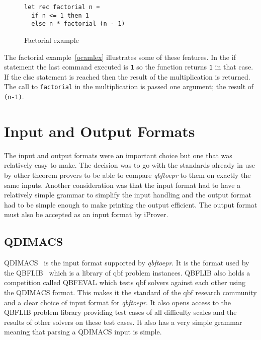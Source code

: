 \begin{figure}[H]
\caption{Factorial example}
\begin{CenteredBox}
\begin{lstlisting}[language=caml, label=ocamlex]
let rec factorial n =
  if n <= 1 then 1
  else n * factorial (n - 1)
\end{lstlisting}
\end{CenteredBox}
\end{figure}

The factorial example~\ref{ocamlex} illustrates some of these features. In the if statement the last command executed is \texttt{1} so the function returns \texttt{1} in that case. If the else statement is reached then the result of the multiplication is returned. The call to \texttt{factorial} in the multiplication is passed one argument; the result of \texttt{(n-1)}.

\section{Input and Output Formats}
The input and output formats were an important choice but one that was relatively easy to make. The decision was to go with the standards already in use by other theorem provers to be able to compare \textit{qbftoepr} to them on exactly the same inputs. Another consideration was that the input format had to have a relatively simple grammar to simplify the input handling and the output format had to be simple enough to make printing the output efficient. The output format must also be accepted as an input format by iProver.

\subsection{QDIMACS}
QDIMACS~\cite{qdimacs} is the input format supported by \textit{qbftoepr}. It is the format used by the QBFLIB~\cite{qbflib} which is a library of \gls{qbf} problem instances. QBFLIB also holds a competition called QBFEVAL which tests \gls{qbf} solvers against each other using the QDIMACS format. This makes it the standard of the \gls{qbf} research community and a clear choice of input format for \textit{qbftoepr}. It also opens access to the QBFLIB problem library providing test cases of all difficulty scales and the results of other solvers on these test cases. It also has a very simple grammar meaning that parsing a QDIMACS input is simple.

